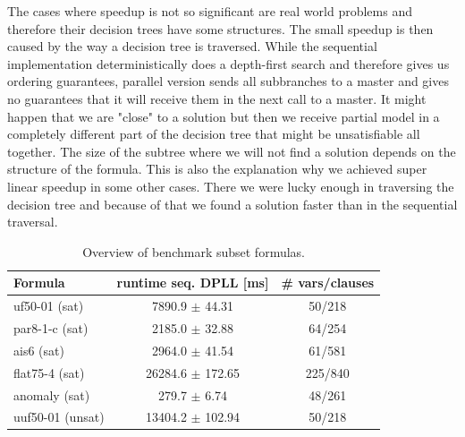 \documentclass[letterpaper]{article}
\begin{document}
The cases where speedup is not so significant are real world problems and therefore their decision trees have some structures. The small speedup is then caused by the way a decision tree is traversed.
While the sequential implementation deterministically does a depth-first search and therefore gives us ordering guarantees, parallel version sends all subbranches to a master and gives no guarantees that it will receive them in the next call to a master. 
It might happen that we are "close" to a solution but then we receive partial model in a completely different part of the decision tree that might be unsatisfiable all together. 
The size of the subtree where we will not find a solution depends on the structure of the formula.
This is also the explanation why we achieved super linear speedup in some other cases. There we were lucky enough in traversing the decision tree and because of that we found a solution faster than in the sequential traversal.

\begin{table}
    \centering
    \begin{tabular}{|l|c|c|}
        \hline
        Formula & runtime seq. DPLL [ms] & \# vars/clauses \\
        \hline
        \hline
        uf50-01 (sat) & 7890.9 $\pm$ 44.31 & 50/218\\
        \hline
        par8-1-c (sat) & 2185.0 $\pm$ 32.88 & 64/254\\
        \hline
        ais6 (sat) &  2964.0 $\pm$ 41.54 & 61/581\\
        \hline
        flat75-4 (sat) & 26284.6 $\pm$ 172.65 & 225/840\\
        \hline
        anomaly (sat) & 279.7 $\pm$ 6.74 & 48/261\\
        \hline
        uuf50-01 (unsat) & 13404.2 $\pm$ 102.94 & 50/218\\
        \hline
    \end{tabular}
    \caption{Overview of benchmark subset formulas.}
    \label{tab:cnfs_representatives}
\end{table}
\end{document}
